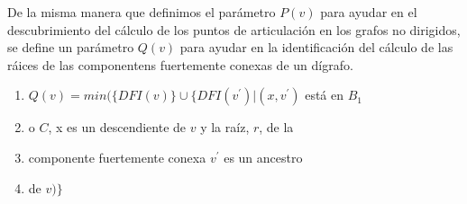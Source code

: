 \documentclass[10pt,a5paper]{book}
\begin{document}
De la misma manera que definimos el parámetro $P(v)$ para ayudar en el descubrimiento del cálculo de los puntos de articulación en los grafos no dirigidos, se define un parámetro $Q(v)$ para ayudar en la identificación del cálculo de las ráices de las componentens fuertemente conexas de un dígrafo.
\begin{enumerate}
\item[] \hspace*{0.05in} $Q(v) = min(\{DFI(v)\} \cup \{DFI(v^{'})|(x,v^{'})$ está en $B_1$
\item[] \hspace*{0.1in} o $C$, x es un descendiente de $v$ y la raíz, $r$, de la
\item[] \hspace*{0.1in} componente fuertemente conexa $v^{'}$ es un ancestro
\item[] \hspace*{0.1in} de $v)\}$
\end{enumerate}
\end{document}
